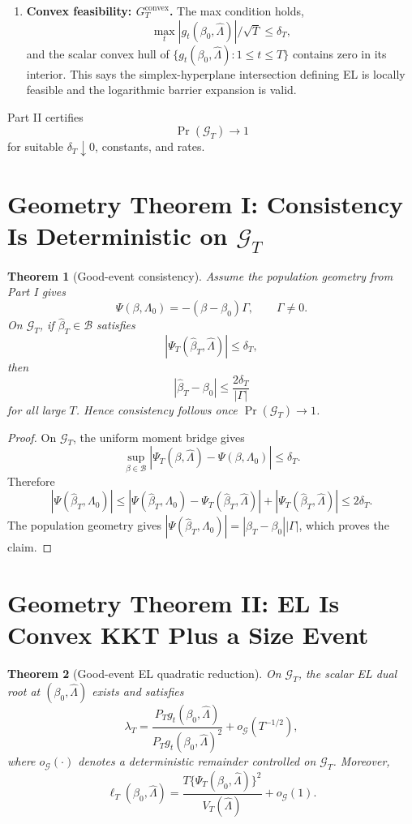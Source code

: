 \documentclass[12pt]{article}
\numberwithin{equation}{section}
\newtheorem{theorem}{Theorem}
\theoremstyle{definition}
\begin{document}
\begin{enumerate}[leftmargin=2em]
\item \textbf{Convex feasibility: \(G_T^{\mathrm{convex}}\).} The max condition
holds,
\[
    \max_t|g_t(\beta_0,\widehat\Lambda)|/\sqrt T\le\delta_T,
\]
and the scalar convex hull of
\(\{g_t(\beta_0,\widehat\Lambda):1\le t\le T\}\) contains zero in its interior.
This says the simplex-hyperplane intersection defining EL is locally feasible
and the logarithmic barrier expansion is valid.
\end{enumerate}

Part II certifies
\[
    \Pr(\mathcal G_T)\to1
\]
for suitable \(\delta_T\downarrow0\), constants, and rates.
\section{Geometry Theorem I: Consistency Is Deterministic on \texorpdfstring{\(\mathcal G_T\)}{GT}}

\begin{theorem}[Good-event consistency]
\label{thm:v2-good-event-consistency}
Assume the population geometry from Part I gives
\[
    \Psi(\beta,\Lambda_0)=-(\beta-\beta_0)\Gamma,
    \qquad \Gamma\ne0.
\]
On \(\mathcal G_T\), if \(\widehat\beta_T\in\mathcal B\) satisfies
\[
    |\Psi_T(\widehat\beta_T,\widehat\Lambda)|\le\delta_T,
\]
then
\[
    |\widehat\beta_T-\beta_0|\le \frac{2\delta_T}{|\Gamma|}
\]
for all large \(T\). Hence consistency follows once
\(\Pr(\mathcal G_T)\to1\).
\end{theorem}

\begin{proof}
On \(\mathcal G_T\), the uniform moment bridge gives
\[
    \sup_{\beta\in\mathcal B}
    |\Psi_T(\beta,\widehat\Lambda)-\Psi(\beta,\Lambda_0)|\le\delta_T.
\]
Therefore
\[
    |\Psi(\widehat\beta_T,\Lambda_0)|
    \le |\Psi(\widehat\beta_T,\Lambda_0)
          -\Psi_T(\widehat\beta_T,\widehat\Lambda)|
       +|\Psi_T(\widehat\beta_T,\widehat\Lambda)|
    \le 2\delta_T.
\]
The population geometry gives
\(|\Psi(\widehat\beta_T,\Lambda_0)|=|\widehat\beta_T-\beta_0||\Gamma|\), which
proves the claim.
\end{proof}

\section{Geometry Theorem II: EL Is Convex KKT Plus a Size Event}

\begin{theorem}[Good-event EL quadratic reduction]
\label{thm:v2-good-event-el}
On \(\mathcal G_T\), the scalar EL dual root at
\((\beta_0,\widehat\Lambda)\) exists and satisfies
\[
    \lambda_T
    =\frac{P_Tg_t(\beta_0,\widehat\Lambda)}
           {P_Tg_t(\beta_0,\widehat\Lambda)^2}
      +o_{\mathcal G}(T^{-1/2}),
\]
where \(o_{\mathcal G}(\cdot)\) denotes a deterministic remainder controlled on
\(\mathcal G_T\). Moreover,
\[
    \ell_T(\beta_0,
    \widehat\Lambda)
    =\frac{T\{\Psi_T(\beta_0,\widehat\Lambda)\}^2}
           {V_T(\widehat\Lambda)}+o_{\mathcal G}(1).
\]
\end{theorem}
\end{document}
